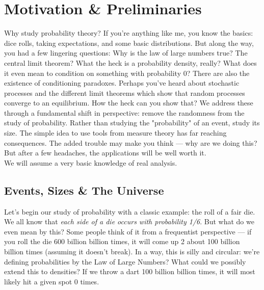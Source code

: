 

\chapter{Motivation \& Preliminaries}

Why study probability theory? If you're anything like me, you know the basics: dice rolls, taking expectations, and
some basic distributions. But along the way, you had a few lingering questions: Why is the law of large numbers true?
The central limit theorem? What the heck is a probability density, really? What does it even mean to condition on
something with probability 0? There are also the existence of conditioning paradoxes. Perhaps you've heard about
stochastic processes and the different limit theorems which show that random processes converge to an equilibrium.
How the heck can you show that? We address these through a fundamental shift in perspective: remove the randomness from the study of probability. 
Rather than studying the "probability" of an event, study its size. The simple idea to use tools from measure theory
has far reaching consequences. The added trouble may make you think — why are we doing this? But after a few headaches,
the applications will be well worth it. \\

We will assume a very basic knowledge of real analysis.

\section{Events, Sizes \& The Universe}

Let's begin our study of probability with a classic example: the roll of a fair die. 
We all know that \emph{each side of a die occurs with probability 1/6}. But what do we even 
mean by this? Some people think of it from a frequentist perspective — if you roll the die 
600 billion billion times, it will come up 2 about 100 billion billion times (assuming it doesn't break). 
In a way, this is silly and circular: we're defining probabilities by the Law of Large Numbers? 
What could we possibly extend this to densities? If we throw a dart 100 billion billion times, 
it will most likely hit a given spot 0 times. \\ 

